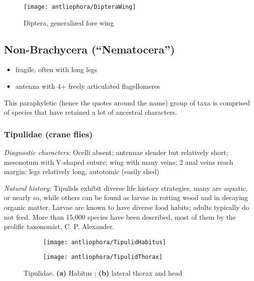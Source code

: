 \begin{figure}[ht!]
  \centering
    \texttt{[image: antliophora/DipteraWing]}
  \caption{Diptera, generalized fore wing \citep[][Fig. 67]{mcalpine1981manual}}
  \label{fig:dipteranwing}
\end{figure}

\subsection{Non-Brachycera (``Nematocera'')}
\begin{itemize}
\item fragile, often with long legs 
\item antenna with 4+ freely articulated flagellomeres
\end{itemize}
This paraphyletic (hence the quotes around the name) group of taxa is comprised of species that have retained a lot of ancestral characters. 

\subsubsection{Tipulidae (crane flies)}
\noindent{}\textit{Diagnostic characters:} Ocelli absent; antennae slender but relatively short; mesonotum with V-shaped suture; wing with many veins; 2 anal veins reach margin; legs relatively long, autotomic (easily shed)\vspace{3mm}

\noindent{}\textit{Natural history:} Tipulids exhibit diverse life history strategies. many are aquatic, or nearly so, while others can be found as larvae in rotting wood and in decaying organic matter. Larvae are known to have diverse food habits; adults typically do not feed. More than 15,000 species have been described, most of them by the prolific taxonomist, C. P. Alexander.\vspace{3mm}

\begin{figure}[ht!]
    \centering
    \begin{subfigure}[ht!]{0.4\textwidth}
        \texttt{[image: antliophora/TipulidHabitus]}
        \caption{}
        \label{fig:tipulid1}
    \end{subfigure}
    \qquad 
    \begin{subfigure}[ht!]{0.45\textwidth}
        \texttt{[image: antliophora/TipulidThorax]}
        \caption{}
        \label{fig:tipulid2}
    \end{subfigure}
    \caption{Tipulidae. \textbf{(a)} Habitus \citep[][Fig. 7.1]{mcalpine1981manual}; \textbf{(b)} lateral thorax and head \citep[][Fig. 7.2]{mcalpine1981manual}}\label{fig:tipulids}
\end{figure}

